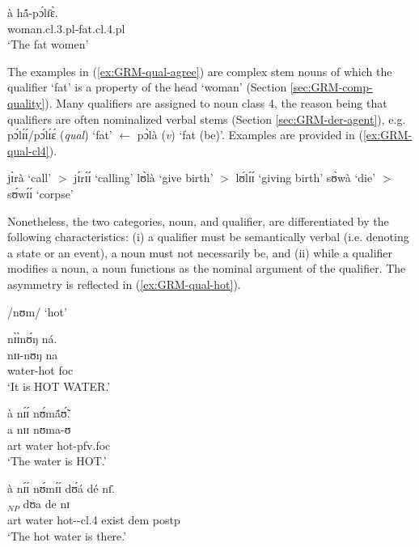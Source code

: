 \begin{exe}
\begin{exe}
\begin{exe}
{\begin{exe}
\begin{exe}
\begin{exe}
\begin{exe}
\begin{exe}
\begin{exe}
\begin{exe}
  \ex\label{ex:GRM-qual-agree-pl}

\gll à hã́-pɔ́lɪ̄ɛ̀.\\
{\art} woman.{\sc cl.3.pl}-fat.{\sc cl.4.pl}\\
\glt `The fat women'

  
\z 
 \z

The examples in (\ref{ex:GRM-qual-agree}) are complex stem nouns  of which the qualifier  `fat'  is 
a property of   the head `woman' (Section \ref{sec:GRM-comp-quality}). Many qualifiers are 
assigned to noun class 4, the reason being that qualifiers are often nominalized verbal stems 
(Section \ref{sec:GRM-der-agent}), e.g. {\sls pɔ́lɪ́ɪ́/pɔ́lɪ́ɛ́} ({\it qual}) 
`fat' $\leftarrow$ {\sls pɔ̀là}  ({\it v})  `fat (be)'.  Examples are provided in  
(\ref{ex:GRM-qual-cl4}).


\ea\label{ex:GRM-qual-cl4}
 
  \ea\label{ex:GRM-qual-cl4-call}
jɪ̀rà  {\rm `call'}  $>$ jɪ́rɪ́ɪ́ {\rm   `calling'}
\ex\label{ex:GRM-qual-cl4-give-birth}
lʊ̀là {\rm  `give birth'} $>$ lʊ́lɪ́ɪ́   {\rm `giving birth'}
\ex\label{ex:GRM-qual-cl4-die}
sʊ̀wà {\rm  `die'} $>$ sʊ́wɪ́ɪ́  {\rm  `corpse'}

  
\z 
 \z



Nonetheless, the two categories, noun, and qualifier, are differentiated by the
following characteristics: (i)  a qualifier must be semantically verbal (i.e. 
denoting a state or an event),
a noun must not necessarily be, and (ii) while a qualifier
modifies a noun,  a  noun functions as  the
nominal argument of the qualifier. The asymmetry is reflected in
(\ref{ex:GRM-qual-hot}).

\ea\label{ex:GRM-qual-hot}{\rm  /nʊm/ `hot'}
 
  \ea\label{ex:GRM-qual-hot-cmp-stem}
  \glll nɪ̀ɪ̀nʊ́ŋ ná.\\
 nɪɪ-nʊŋ na\\
  water-hot {\sc foc}\\
  \glt `It is HOT WATER.'

 \ex\label{ex:GRM-qual-hot-head}
  \glll  à nɪ́ɪ́ nʊ́mã́ʊ̃́.\\
 a  nɪɪ nʊma-ʊ\\
   {\sc art} water hot-{\sc pfv.foc}\\
  \glt `The water is HOT.'

 \ex\label{ex:GRM-qual-hot-qual}
  \glll  à nɪ́ɪ́ nʊ́mɪ́ɪ́ dʊ́á dé nɪ̄.\\
 [a nɪɪ nʊm-ɪ-ɪ]$_{NP}$ dʊa de nɪ \\
  {\sc art} water hot-{\nmlz}-{\sc cl.4} exist {\sc dem} {\sc postp}\\
  \glt `The hot water is there.'
  

\end{exe}
\end{exe}
\end{exe}
\end{exe}
\end{exe}
\end{exe}
\end{exe}}
\end{exe}
\end{exe}
\end{exe}
